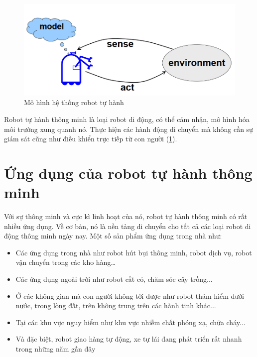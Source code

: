 \begin{figure}[htp]
  \centering
  \includegraphics[width=12cm]{figures/c1_AutonomousRBModel.png}
  \caption{Mô hình hệ thống robot tự hành}
  \label{fig:MohinhRB}
\end{figure}


Robot tự hành thông minh là loại robot di động, có thể cảm nhận, mô hình hóa môi trường xung quanh nó. Thực hiện các hành động di chuyển mà không cần sự giám sát cũng như điều khiển trực tiếp từ con người (\figurename{\ref{fig:MohinhRB}}).


\section{Ứng dụng của robot tự hành thông minh}
\label{sec:ungdung}

Với sự thông minh và cực kì linh hoạt của nó, robot tự hành thông minh có rất nhiều ứng dụng. Về cơ bản, nó là nền tảng di chuyển cho tất cả các loại robot di động thông minh ngày nay. Một số sản phẩm ứng dụng trong nhà như:

\begin{itemize}
\item Các ứng dụng trong nhà như robot hút bụi thông minh, robot dịch vụ, robot vận chuyển trong các kho hàng\dots
\item Các ứng dụng ngoài trời như robot cắt cỏ, chăm sóc cây trồng...
\item Ở các không gian mà con người không tới được như robot thám hiểm dưới nước, trong lòng đất, trên không trung trên các hành tinh khác...
\item Tại các khu vực nguy hiểm như khu vực nhiễm chất phóng xạ, chữa cháy...
\item Và đặc biệt, robot giao hàng tự động, xe tự lái đang phát triển rất nhanh trong những năm gần đây
\end{itemize}

